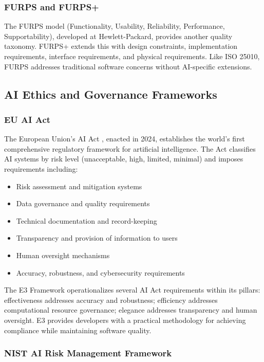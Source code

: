 \subsubsection{FURPS and FURPS+}

The FURPS model (Functionality, Usability, Reliability, Performance, Supportability), developed at Hewlett-Packard, provides another quality taxonomy. FURPS+ extends this with design constraints, implementation requirements, interface requirements, and physical requirements. Like ISO 25010, FURPS addresses traditional software concerns without AI-specific extensions.

\subsection{AI Ethics and Governance Frameworks}

\subsubsection{EU AI Act}

The European Union's AI Act \cite{euaiact2024}, enacted in 2024, establishes the world's first comprehensive regulatory framework for artificial intelligence. The Act classifies AI systems by risk level (unacceptable, high, limited, minimal) and imposes requirements including:

\begin{itemize}[leftmargin=2em]
    \item Risk assessment and mitigation systems
    \item Data governance and quality requirements
    \item Technical documentation and record-keeping
    \item Transparency and provision of information to users
    \item Human oversight mechanisms
    \item Accuracy, robustness, and cybersecurity requirements
\end{itemize}

The E3 Framework operationalizes several AI Act requirements within its pillars: effectiveness addresses accuracy and robustness; efficiency addresses computational resource governance; elegance addresses transparency and human oversight. E3 provides developers with a practical methodology for achieving compliance while maintaining software quality.

\subsubsection{NIST AI Risk Management Framework}


